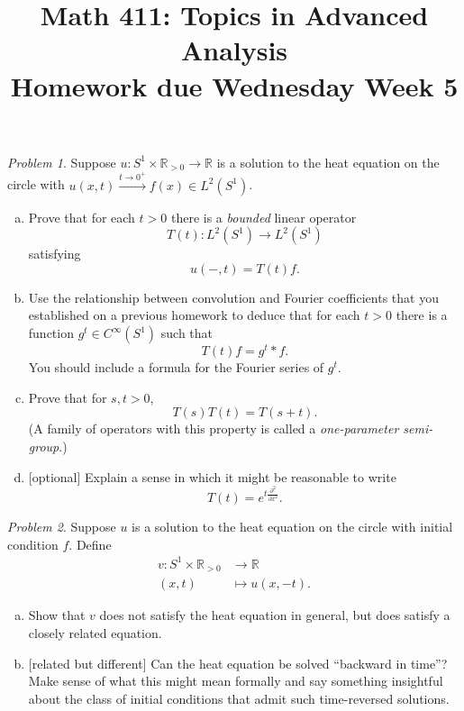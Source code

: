\documentclass[11pt,twoside]{amsart}
\title{Math 411: Topics in Advanced Analysis\\ Homework due Wednesday Week 5}
\theoremstyle{plain}
\theoremstyle{remark}
\newtheorem{prob}{Problem}
\theoremstyle{definition}
\theoremstyle{definition}
\newcommand{\RR}{\mathbb{R}}
\begin{document}
\maketitle

\begin{prob}
Suppose $u\colon S^1\times \RR_{>0}\to \RR$ is a solution to the heat equation on the circle with $u(x,t)\xrightarrow{t\to 0^+}f(x)\in L^2(S^1)$.
\begin{enumerate}[(a)]
\item Prove that for each $t>0$ there is a \emph{bounded} linear operator
\[
  T(t)\colon L^2(S^1)\longrightarrow L^2(S^1)
\]
satisfying
\[
  u(-,t) = T(t)f.
\]
\item Use the relationship between convolution and Fourier coefficients that you established on a previous homework to deduce that for each $t>0$ there is a function $g^t\in C^\infty(S^1)$ such that
\[
  T(t)f = g^t*f.
\]
You should include a formula for the Fourier series of $g^t$.
\item Prove that for $s,t>0$,
\[
  T(s)T(t) = T(s+t).
\]
(A family of operators with this property is called a \emph{one-parameter semi-group}.)
\item {[optional]} Explain a sense in which it might be reasonable to write
\[
  T(t) = e^{t\frac{\partial^2}{\partial x^2}}.
\]
\end{enumerate}
\end{prob}


\begin{prob}
Suppose $u$ is a solution to the heat equation on the circle with initial condition $f$. Define
\[
\begin{aligned}
  v\colon S^1\times \RR_{>0}&\longrightarrow \RR\\
  (x,t)&\longmapsto u(x,-t).
\end{aligned}
\]
\begin{enumerate}[(a)]
\item Show that $v$ does not satisfy the heat equation in general, but does satisfy a closely related equation.
\item {[related but different]} Can the heat equation be solved ``backward in time''? Make sense of what this might mean formally and say something insightful about the class of initial conditions that admit such time-reversed solutions.
\end{enumerate}
\end{prob}
\end{document}
